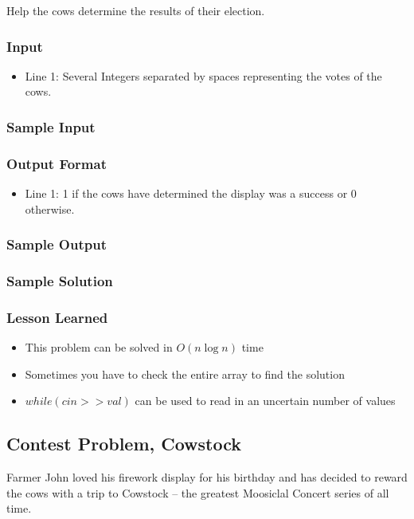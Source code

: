 Help the cows determine the results of their election.

\subsubsection{Input}
\begin{itemize}
	\item Line 1: Several Integers separated by spaces representing the votes of the cows.
\end{itemize}

\subsubsection{Sample Input}


\subsubsection{Output Format}
\begin{itemize}
	\item Line 1: 1 if the cows have determined the display was a success or 0 otherwise.
\end{itemize}
\subsubsection{Sample Output}


\subsubsection{Sample Solution}


\subsubsection{Lesson Learned}
\begin{itemize}
	\item This problem can be solved in $O(n \log n)$ time
	\item Sometimes you have to check the entire array to find the solution
	\item $while( cin >> val)$ can be used to read in an uncertain number of values
\end{itemize}

\subsection{Contest Problem, Cowstock}
Farmer John loved his firework display for his birthday and has decided to reward the cows with a trip to Cowstock -- the greatest Moosiclal Concert series of all time.


